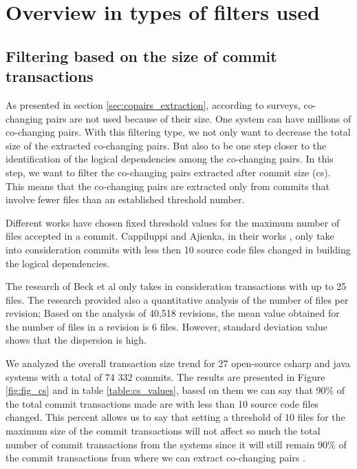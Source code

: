 \section{Overview in types of filters used}

\subsection{Filtering based on the size of commit transactions}
\label{sec:filtercommit}

As presented in section \ref{sec:copairs_extraction}, according to surveys,  co-changing pairs are not used because of their size. One system can have millions of co-changing pairs.
With this filtering type, we not only want to decrease the total size of the extracted co-changing pairs. But also to be one step closer to the identification of the logical dependencies among the co-changing pairs.
In this step, we want to filter the co-changing pairs extracted after commit size (cs). This means that the co-changing pairs are extracted only from commits that involve fewer files than an established threshold number. 

Different works have chosen fixed threshold values for the maximum number of files accepted in a commit. Cappiluppi and Ajienka, in their works \cite{DBLP:journals/jss/AjienkaC17}, \cite{DBLP:journals/ese/AjienkaCC18} only take into consideration commits with less then 10 source code files changed in building the logical dependencies.

The research of Beck et al \cite{Beck:2011:CMC:2025113.2025162} only takes in consideration transactions with up to 25 files. The research \cite{Oliva:2011:ISL:2067853.2068086} provided also a quantitative analysis of the number of files per revision; Based on the analysis of 40,518 revisions, the mean value obtained for the number of files in a revision is 6 files. However, standard deviation value shows that the dispersion is high. 

We analyzed the overall transaction size trend for 27 open-source csharp and java systems with a total of 74 332 commits. The results are presented in Figure \ref{fig:fig_cs} and in table \ref{table:cs_values}, based on them we can say that 90\% of the total commit transactions made are with less than 10 source code files changed. This percent allows us to say that setting a threshold of 10 files for the maximum size of the commit transactions will not affect so much the total number of commit transactions from the systems since it will still remain 90\% of the commit transactions from where we can extract co-changing pairs \cite{DepSACI}.


